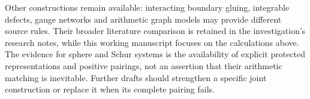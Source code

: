 Other constructions remain available: interacting boundary gluing,
integrable defects, gauge networks and arithmetic graph models may
provide different source rules. Their broader literature comparison
is retained in the investigation's research notes, while this working
manuscript focuses on the calculations above. The evidence for sphere
and Schur systems is the availability of explicit protected
representations and positive pairings, not an assertion that their
arithmetic matching is inevitable. Further drafts should strengthen a
specific joint construction or replace it when its complete pairing fails.

